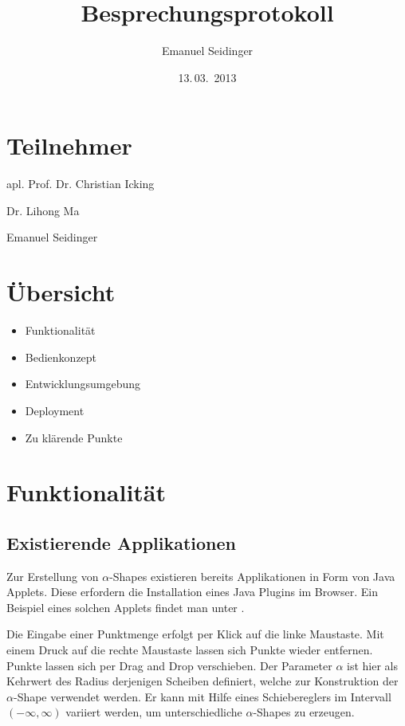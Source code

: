 \documentclass[12pt,a4paper]{scrartcl}
\author{Emanuel Seidinger}
\title{Besprechungsprotokoll}
\date{13.\,03.~2013}
\begin{document}
\maketitle

\section*{Teilnehmer}
\begin{list}{}{}
\item apl. Prof. Dr. Christian Icking
\item Dr. Lihong Ma
\item Emanuel Seidinger
\end{list}

\section*{Übersicht}
\begin{itemize}
\item Funktionalität
\item Bedienkonzept
\item Entwicklungsumgebung
\item Deployment
\item Zu klärende Punkte
\end{itemize}

\section*{Funktionalität}

\subsection*{Existierende Applikationen}
Zur Erstellung von $\alpha$-Shapes existieren bereits Applikationen in Form von Java Applets.
Diese erfordern die Installation eines Java Plugins im Browser.
Ein Beispiel eines solchen Applets findet man unter \cite{alpha_applet}.

Die Eingabe einer Punktmenge erfolgt per Klick auf die linke Maustaste. Mit einem Druck auf die
rechte Maustaste lassen sich Punkte wieder entfernen. Punkte lassen sich per Drag and Drop verschieben.
Der Parameter $\alpha$ ist hier als Kehrwert des Radius derjenigen Scheiben definiert, welche zur
Konstruktion der $\alpha$-Shape verwendet werden. Er kann mit Hilfe eines Schiebereglers im Intervall 
$(-\infty, \infty)$ variiert werden, um unterschiedliche $\alpha$-Shapes zu erzeugen.
\end{document}
